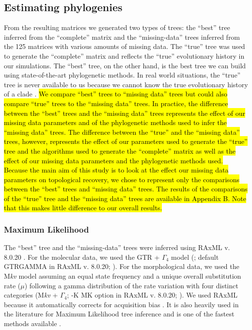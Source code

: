 \documentclass[12pt,letterpaper]{article}
\begin{document}
\subsection{Estimating phylogenies}
From the resulting matrices we generated two types of trees: the ``best'' tree inferred from the ``complete'' matrix and the ``missing-data'' trees inferred from the 125 matrices with various amounts of missing data.
The ``true'' tree was used to generate the ``complete'' matrix and reflects the ``true'' evolutionary history in our simulations.
The ``best'' tree, on the other hand, is the best tree we can build using state-of-the-art phylogenetic methods.
In real world situations, the ``true'' tree is never available to us because we cannot know the true evolutionary history of a clade \citep[except in very rare circumstances, e.g.][]{rozen2005}.
\hl{We compare ``best'' trees to ``missing data'' trees but could also compare ``true'' trees to the ``missing data'' trees.
In practice, the difference between the ``best'' trees and the ``missing data'' trees represents the effect of our missing data parameters and of the phylogenetic methods used to infer the ``missing data'' trees.
The difference between the ``true'' and the ``missing data'' trees, however, represents the effect of our parameters used to generate the ``true'' tree and the algorithms used to generate the ``complete'' matrix as well as the effect of our missing data parameters and the phylogenetic methods used.
Because the main aim of this study is to look at the effect our missing data parameters on topological recovery, we chose to represent only the comparisons between the ``best'' trees and ``missing data'' trees.
The results of the comparisons of the ``true'' tree and the ``missing data'' trees are available in Appendix B.
Note that this makes little difference to our overall results.}

\subsubsection{Maximum Likelihood}
The ``best'' tree and the ``missing-data'' trees were inferred using RAxML v. 8.0.20 \citep{Stamatakis21012014}. For the molecular data, we used the GTR + $\Gamma_4$ model (\citealp{tavare1986}; default GTRGAMMA in RAxML v. 8.0.20; \citealp{Stamatakis21012014}).
For the morphological data, we used the M\textit{kv} model \citep{lewisa2001} assuming an equal state frequency and a unique overall substitution rate ($\mu$) following a gamma distribution of the rate variation with four distinct categories (M\textit{kv} + $\Gamma_4$; -K MK option in RAxML v. 8.0.20; \citealp{Stamatakis21012014}).
We used RAxML because it automatically corrects for acquisition bias \citep{lewisa2001}. It is also heavily used in the literature for Maximum Likelihood tree inference \citep[e.g.][]{rouresite-specific2011,Bogdanowicz2012,springermacroevolutionary2012,O'Leary08022013,kellymolecular2014} and is one of the fastest methods available \citep{Stamatakis01102008}. 
\end{document}

